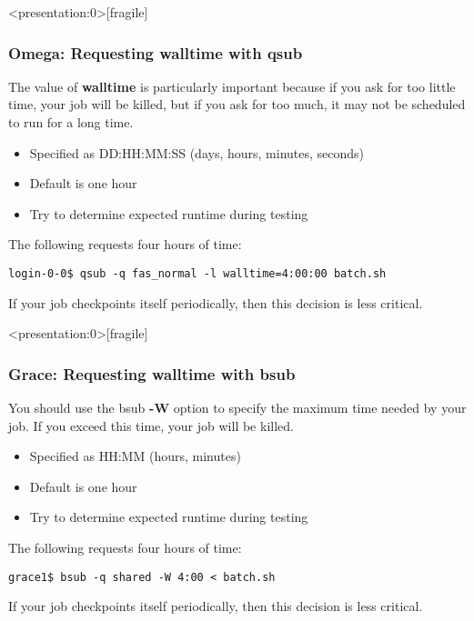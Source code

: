 \documentclass[10pt]{beamer}
\begin{document}
\begin{frame}<presentation:0>[fragile]
\frametitle{Omega: Requesting walltime with qsub}
The value of \textbf{walltime} is particularly important because if you
ask for too little time, your job will be killed, but if you ask for too
much, it may not be scheduled to run for a long time.

\begin{itemize}
\item Specified as DD:HH:MM:SS (days, hours, minutes, seconds)
\item Default is one hour
\item Try to determine expected runtime during testing
\end{itemize}

The following requests four hours of time:

\begin{verbatim}
login-0-0$ qsub -q fas_normal -l walltime=4:00:00 batch.sh
\end{verbatim}

If your job checkpoints itself periodically, then this decision is
less critical.
\end{frame}

\begin{frame}<presentation:0>[fragile]
\frametitle{Grace: Requesting walltime with bsub}
You should use the bsub \textbf{-W} option to specify the maximum time
needed by your job. If you exceed this time, your job will be killed.

\begin{itemize}
\item Specified as HH:MM (hours, minutes)
\item Default is one hour
\item Try to determine expected runtime during testing
\end{itemize}

The following requests four hours of time:

\begin{verbatim}
grace1$ bsub -q shared -W 4:00 < batch.sh
\end{verbatim}

If your job checkpoints itself periodically, then this decision is
less critical.
\end{frame}
\end{document}
